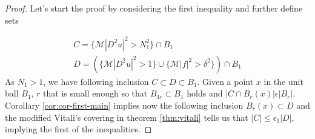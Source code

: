 \documentclass[12pt]{artikel1}
\begin{document}
\begin{proof}
    Let's start the proof by considering the first inequality and further define sets

    \begin{gather*}
        C = \{\mathcal{M}|D^2u|^2>N_1^2\}\cap B_1 \\
        D = (\{\mathcal{M}|D^2u|^2>1\}\cup\{\mathcal{M}|f|^2>\delta^2\})\cap B_1
    \end{gather*}
    As $N_1>1$, we have following inclusion $C\subset D\subset B_1$. Given a point $x$ in the unit ball $B_1$, $r$ that is small enough so that $B_{4r}\subset B_1$ holds and $|C\cap B_r(x)|\epsilon|B_r|$. Corollary \ref{cor:cor-first-main} implies now the following inclusion $B_r(x)\subset D$ and the modified Vitali's covering in theorem \ref{thm:vitali} tells us that $|C|\leq\epsilon_1|D|$, implying the first of the inequalities.


\end{proof}
\end{document}
